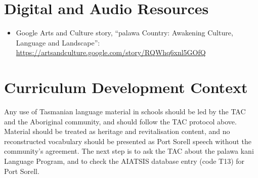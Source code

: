 \documentclass[12pt]{article}
\begin{document}
\section{Digital and Audio Resources}
\begin{itemize}
\item Google Arts and Culture story, ``palawa Country: Awakening Culture, Language and Landscape'': \url{https://artsandculture.google.com/story/RQWhq6xnl5GOfQ}
\end{itemize}

\section{Curriculum Development Context}
Any use of Tasmanian language material in schools should be led by the TAC and the Aboriginal community, and should follow the TAC protocol above. Material should be treated as heritage and revitalisation content, and no reconstructed vocabulary should be presented as Port Sorell speech without the community's agreement. The next step is to ask the TAC about the palawa kani Language Program, and to check the AIATSIS database entry (code T13) for Port Sorell.
\end{document}
